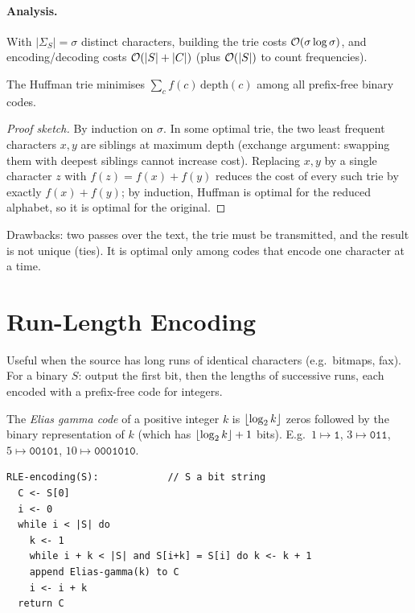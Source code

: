 \paragraph{Analysis.} With $|\Sigma_S| = \sigma$ distinct characters, building
the trie costs $\mathcal{O}(\sigma \log \sigma)$, and encoding/decoding costs
$\mathcal{O}(|S| + |C|)$ (plus $\mathcal{O}(|S|)$ to count frequencies).

\begin{theorem}
The Huffman trie minimises $\sum_c f(c)\,\text{depth}(c)$ among all prefix-free
binary codes.
\end{theorem}
\begin{proof}[Proof sketch]
By induction on $\sigma$. In some optimal trie, the two least frequent
characters $x, y$ are siblings at maximum depth (exchange argument: swapping them
with deepest siblings cannot increase cost). Replacing $x,y$ by a single
character $z$ with $f(z) = f(x) + f(y)$ reduces the cost of every such trie by
exactly $f(x) + f(y)$; by induction, Huffman is optimal for the reduced
alphabet, so it is optimal for the original.
\end{proof}

Drawbacks: two passes over the text, the trie must be transmitted, and the
result is not unique (ties). It is optimal only among codes that encode one
character at a time.

\section{Run-Length Encoding}

Useful when the source has long runs of identical characters (e.g.\ bitmaps,
fax). For a binary $S$: output the first bit, then the lengths of successive
runs, each encoded with a prefix-free code for integers.

\begin{definition}
The \emph{Elias gamma code} of a positive integer $k$ is
$\left\lfloor \log_2 k \right\rfloor$ zeros followed by the binary representation of $k$
(which has $\left\lfloor \log_2 k \right\rfloor + 1$ bits). E.g.\ $1 \mapsto \texttt{1}$,
$3 \mapsto \texttt{011}$, $5 \mapsto \texttt{00101}$, $10 \mapsto \texttt{0001010}$.
\end{definition}

\begin{lstlisting}
RLE-encoding(S):            // S a bit string
  C <- S[0]
  i <- 0
  while i < |S| do
    k <- 1
    while i + k < |S| and S[i+k] = S[i] do k <- k + 1
    append Elias-gamma(k) to C
    i <- i + k
  return C
\end{lstlisting}

